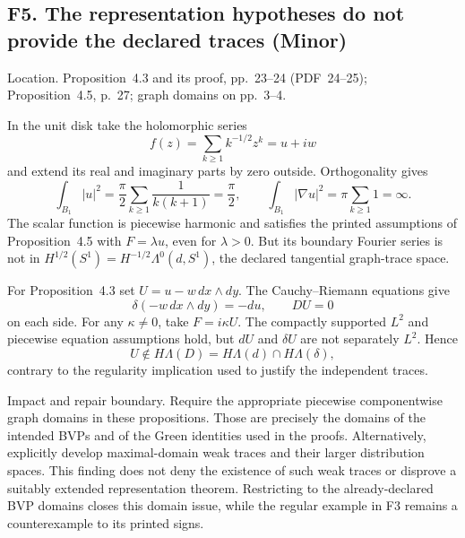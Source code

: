 \documentclass[10pt]{article}
\begin{document}
\subsection*{F5. The representation hypotheses do not provide the declared traces (Minor)}
Location. Proposition 4.3 and its proof, pp. 23–24 (PDF 24–25); Proposition 4.5, p. 27; graph domains on pp. 3–4.\par
In the unit disk take the holomorphic series \[f(z)=\sum_{k\ge1}k^{-1/2}z^k=u+iw\] and extend its real and imaginary parts by zero outside. Orthogonality gives \[\int_{B_1}|u|^2=\frac{\pi}{2}\sum_{k\ge1}\frac1{k(k+1)}
 =\frac{\pi}{2},
 \qquad
 \int_{B_1}|\nabla u|^2=\pi\sum_{k\ge1}1=\infty.\] The scalar function is piecewise harmonic and satisfies the printed assumptions of Proposition 4.5 with \(F=\lambda u\), even for \(\lambda>0\). But its boundary Fourier series is not in \(H^{1/2}(S^1)=H^{-1/2}\Lambda^0(d,S^1)\), the declared tangential graph-trace space.\par
For Proposition 4.3 set \(U=u-w\,dx\wedge dy\). The Cauchy–Riemann equations give \[\delta(-w\,dx\wedge dy)=-du,\qquad DU=0\] on each side. For any \(\kappa\ne0\), take \(F=i\kappa U\). The compactly supported \(L^2\) and piecewise equation assumptions hold, but \(dU\) and \(\delta U\) are not separately \(L^2\). Hence \[U\notin H\Lambda(D)
 =H\Lambda(d)\cap H\Lambda(\delta),\] contrary to the regularity implication used to justify the independent traces.\par
Impact and repair boundary. Require the appropriate piecewise componentwise graph domains in these propositions. Those are precisely the domains of the intended BVPs and of the Green identities used in the proofs. Alternatively, explicitly develop maximal-domain weak traces and their larger distribution spaces. This finding does not deny the existence of such weak traces or disprove a suitably extended representation theorem. Restricting to the already-declared BVP domains closes this domain issue, while the regular example in F3 remains a counterexample to its printed signs.\par
\end{document}
